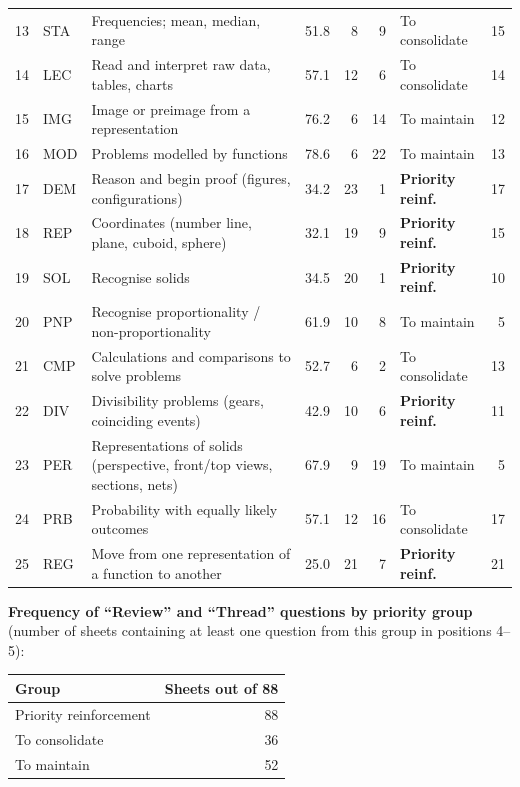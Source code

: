 {\begin{tabular}{@{}l l p{7.1cm} r r r l r@{}}
13 & STA & Frequencies; mean, median, range & \num{51,8} & 8 & 9 & To consolidate & 15 \\
14 & LEC & Read and interpret raw data, tables, charts & \num{57,1} & 12 & 6 & To consolidate & 14 \\
15 & IMG & Image or preimage from a representation & \num{76,2} & 6 & 14 & To maintain & 12 \\
16 & MOD & Problems modelled by functions & \num{78,6} & 6 & 22 & To maintain & 13 \\
17 & DEM & Reason and begin proof (figures, configurations) & \num{34,2} & 23 & 1 & \textbf{Priority reinf.} & 17 \\
18 & REP & Coordinates (number line, plane, cuboid, sphere) & \num{32,1} & 19 & 9 & \textbf{Priority reinf.} & 15 \\
19 & SOL & Recognise solids & \num{34,5} & 20 & 1 & \textbf{Priority reinf.} & 10 \\
20 & PNP & Recognise proportionality / non-proportionality & \num{61,9} & 10 & 8 & To maintain & 5 \\
21 & CMP & Calculations and comparisons to solve problems & \num{52,7} & 6 & 2 & To consolidate & 13 \\
22 & DIV & Divisibility problems (gears, coinciding events) & \num{42,9} & 10 & 6 & \textbf{Priority reinf.} & 11 \\
23 & PER & Representations of solids (perspective, front/top views, sections, nets) & \num{67,9} & 9 & 19 & To maintain & 5 \\
24 & PRB & Probability with equally likely outcomes & \num{57,1} & 12 & 16 & To consolidate & 17 \\
25 & REG & Move from one representation of a function to another & \num{25,0} & 21 & 7 & \textbf{Priority reinf.} & 21 \\
\bottomrule\end{tabular}}\par\bigskip
\textbf{Frequency of ``Review'' and ``Thread'' questions by priority group} (number of sheets containing at least one question from this group in positions 4–5):\par\smallskip
\begin{tabular}{@{}l r@{}}\toprule Group & Sheets out of 88 \\ \midrule
Priority reinforcement & 88 \\
To consolidate & 36 \\
To maintain & 52 \\
\bottomrule\end{tabular}\par